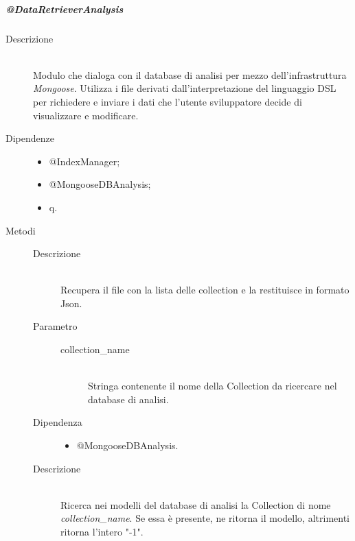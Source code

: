 \subparagraph{@DataRetrieverAnalysis}
\begin{description}
\item[Descrizione] \hfill \\
Modulo che dialoga con il database di analisi per mezzo dell'infrastruttura \textit{Mongoose}. Utilizza i file derivati dall'interpretazione del 
linguaggio DSL per richiedere e inviare i dati che l'utente sviluppatore decide di visualizzare e modificare.
\item[Dipendenze] \hfill 
\begin{itemize}
\item @IndexManager;
\item @MongooseDBAnalysis;
\item q.
\end{itemize}

\item[Metodi]
\begin{mldescription}
   	\begin{description}
   	 \item[Descrizione] \hfill \\
   	 Recupera il file con la lista delle collection e la restituisce in formato Json.
   	\end{description}
		
	 \hfill 
		\begin{description}
			\item[Parametro] \hfill
				\begin{description}
					\item[collection\_name] \hfill \\
					Stringa contenente il nome della Collection da ricercare nel database di analisi.
				\end{description}
			\item[Dipendenza] \hfill
				\begin{itemize}
					\item @MongooseDBAnalysis.
				\end{itemize}
			\item[Descrizione] \hfill \\
			Ricerca nei modelli del database di analisi la Collection di nome \textit{collection\_name}.
Se essa è presente, ne ritorna il modello, altrimenti ritorna l'intero "-1".
		\end{description}


\end{mldescription}
\end{description}
